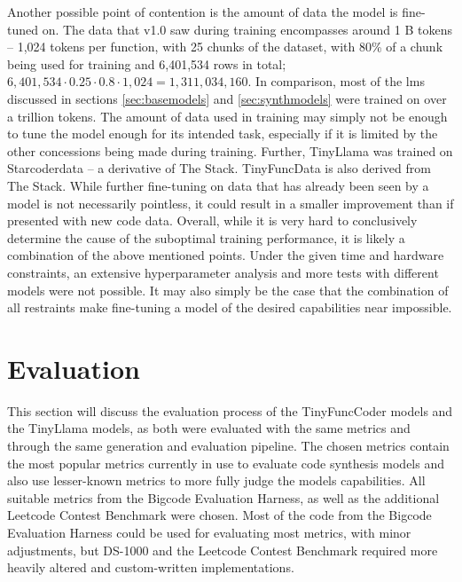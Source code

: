 Another possible point of contention is the amount of data the model is fine-tuned on.
The data that v1.0 saw during training encompasses around 1 B tokens -- 1,024 tokens per function, with 25 chunks of the dataset, with 80\% of a chunk being used for training and 6,401,534 rows in total; $6,401,534 \cdot 0.25 \cdot 0.8 \cdot 1,024 = 1,311,034,160$.
In comparison, most of the \acp{lm} discussed in sections \ref{sec:basemodels} and \ref{sec:synthmodels} were trained on over a trillion tokens.
The amount of data used in training may simply not be enough to tune the model enough for its intended task, especially if it is limited by the other concessions being made during training.
Further, TinyLlama was trained on Starcoderdata -- a derivative of The Stack.
TinyFuncData is also derived from The Stack.
While further fine-tuning on data that has already been seen by a model is not necessarily pointless, it could result in a smaller improvement than if presented with new code data.
Overall, while it is very hard to conclusively determine the cause of the suboptimal training performance, it is likely a combination of the above mentioned points.
Under the given time and hardware constraints, an extensive hyperparameter analysis and more tests with different models were not possible.
It may also simply be the case that the combination of all restraints make fine-tuning a model of the desired capabilities near impossible.

\section{Evaluation}
\label{sec:evaldisc}
This section will discuss the evaluation process of the TinyFuncCoder models and the TinyLlama models, as both were evaluated with the same metrics and through the same generation and evaluation pipeline.
The chosen metrics contain the most popular metrics currently in use to evaluate code synthesis models and also use lesser-known metrics to more fully judge the models capabilities.
All suitable metrics from the Bigcode Evaluation Harness, as well as the additional Leetcode Contest Benchmark were chosen.
Most of the code from the Bigcode Evaluation Harness could be used for evaluating most metrics, with minor adjustments, but DS-1000 and the Leetcode Contest Benchmark required more heavily altered and custom-written implementations.

